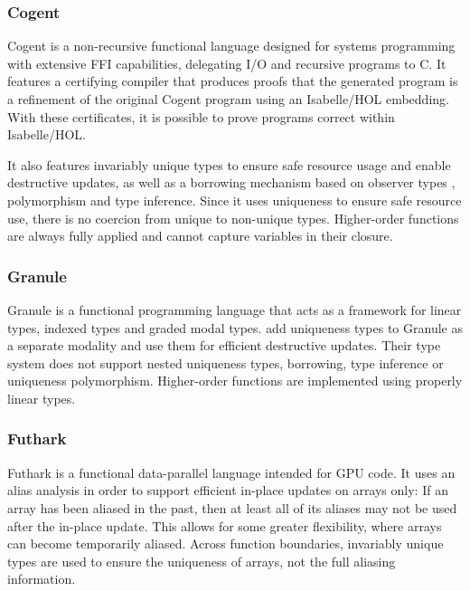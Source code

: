 \subsubsection{Cogent}
Cogent \citep{oconnor_cogent_2021} is a non-recursive functional language designed for systems programming with extensive FFI capabilities, delegating I/O and recursive programs to C. It features a certifying compiler that produces proofs that the generated program is a refinement of the original Cogent program using an Isabelle/HOL \citep{nipkow_isabellehol_2002} embedding. With these certificates, it is possible to prove programs correct within Isabelle/HOL. 

It also features invariably unique types to ensure safe resource usage and enable destructive updates, as well as a borrowing mechanism based on observer types \cite{goos_observers_1992}, polymorphism and type inference. Since it uses uniqueness to ensure safe resource use, there is no coercion from unique to non-unique types. Higher-order functions are always fully applied and cannot capture variables in their closure.

\subsubsection{Granule}
Granule \citep{orchard_quantitative_2019} is a functional programming language that acts as a framework for linear types, indexed types and graded modal types. \cite{sergey_linearity_2022} add uniqueness types to Granule as a separate modality and use them for efficient destructive updates. Their type system does not support nested uniqueness types, borrowing, type inference or uniqueness polymorphism. Higher-order functions are implemented using properly linear types. 

\subsubsection{Futhark}
Futhark \citep{henriksen_futhark_2017} is a functional data-parallel language intended for GPU code. It uses an alias analysis in order to support efficient in-place updates on arrays only: If an array has been aliased in the past, then at least all of its aliases may not be used after the in-place update. This allows for some greater flexibility, where arrays can become temporarily aliased. Across function boundaries, invariably unique types are used to ensure the uniqueness of arrays, not the full aliasing information. 

